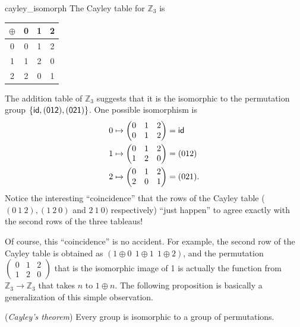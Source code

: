 \begin{example}{cayley_isomorph}
The Cayley table for ${\mathbb Z}_3$ is  
\begin{center}
\begin{tabular}{c|ccc}
$\oplus$   & 0 & 1 & 2 \\
\hline
0     & 0 & 1 & 2 \\
1     & 1 & 2 & 0 \\
2     & 2 & 0 & 1
\end{tabular}
\end{center}
The addition table of ${\mathbb Z}_3$ suggests that it is the isomorphic to the permutation group $ \{ \sf{id}, (0 1 2), (0 2 1) \}$.  One possible isomorphism  is 
\begin{align*}
0 & \mapsto
\begin{pmatrix}
0 & 1 & 2 \\
0 & 1 & 2
\end{pmatrix}
= \sf{id} \\
1 & \mapsto
\begin{pmatrix}
0 & 1 & 2 \\
1 & 2 & 0
\end{pmatrix}
= (0 1 2) \\
2 & \mapsto
\begin{pmatrix}
0 & 1 & 2 \\
2 & 0 & 1
\end{pmatrix}
= (0 2 1).
\end{align*}
Notice the interesting ``coincidence'' that  the rows of the Cayley table ( $(0~1~2), (1~2~0)$ and $2~1~0)$ respectively)  ``just happen'' to agree exactly with the second rows of the three tableaus! 

Of course, this ``coincidence'' is no accident.
For example, the second row of the Cayley table is obtained as $(1\oplus 0~~1\oplus 1~~1\oplus 2)$, and the permutation $\begin{pmatrix}
0 & 1 & 2 \\
1 & 2 & 0
\end{pmatrix}$ 
that is the isomorphic image of 1 is actually the function from ${\mathbb Z}_3 \rightarrow {\mathbb Z}_3$ that takes $n$ to $1 \oplus n$.   The following proposition is basically a generalization of this simple observation.

\end{example}


\begin{thm} (\emph{Cayley's theorem})\label{isomorph_theorem_6} 
Every group is isomorphic to a group of permutations.
\end{thm}

